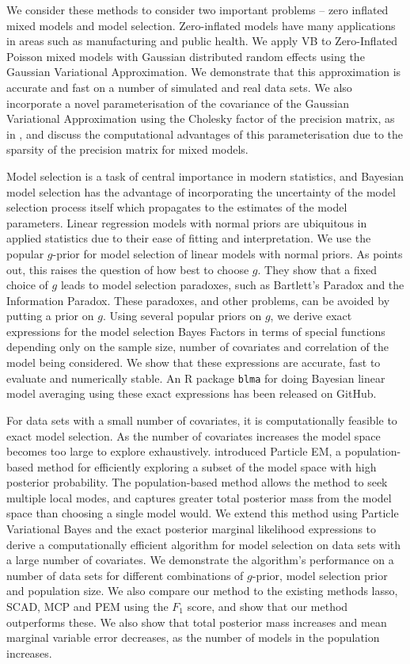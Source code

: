 \documentclass[PhD,stats]{usydthesis}[12pt]
\begin{document}
We consider these methods to consider two important problems -- zero inflated mixed models and model
selection. Zero-inflated models have many applications in areas such as manufacturing and public health. We
apply VB to Zero-Inflated Poisson mixed models with Gaussian distributed random effects using the Gaussian
Variational Approximation. We demonstrate that this approximation is accurate and fast on a number of
simulated and real data sets. We also incorporate a novel parameterisation of the covariance of the Gaussian
Variational Approximation using the Cholesky factor of the precision matrix, as in \cite{Tan2016}, and discuss
the computational advantages of this parameterisation due to the sparsity of the precision matrix for mixed
models.

Model selection is a task of central importance in modern statistics, and  Bayesian model selection has the
advantage of incorporating the uncertainty of the model selection process itself which propagates to the
estimates of the model  parameters. Linear regression models with normal priors are ubiquitous in applied
statistics due to their ease of fitting and interpretation. We use the popular $g$-prior \cite{Zellner1986}
for model selection of linear models with normal priors. As \cite{Liang2008} points out, this raises the
question of how best to choose $g$. They show that a fixed choice of $g$ leads to model selection paradoxes,
such as Bartlett's Paradox and the Information Paradox. These paradoxes, and other problems, can be avoided by
putting a prior on $g$. Using several popular priors on $g$, we derive exact expressions for the model
selection Bayes Factors in terms of special functions depending only on  the sample size, number of covariates
and correlation of the model being considered. We show that these expressions are accurate, fast to evaluate
and numerically stable. An R package \texttt{blma} for doing Bayesian linear model averaging using these
exact expressions has been  released on GitHub.

For data sets with a small number of covariates, it is computationally feasible to exact model selection. As
the number of covariates increases the model space becomes too large to explore exhaustively.
\cite{Rockova2017} introduced Particle EM, a population-based method for efficiently exploring a  subset of
the model space with high posterior probability. The population-based method allows the method to seek
multiple local modes, and captures greater total posterior mass from the model space than choosing a single
model would. We extend this method using Particle Variational Bayes and the exact posterior marginal
likelihood expressions to derive a computationally efficient algorithm for model selection on data sets with a
large number of covariates. We demonstrate the algorithm's performance on a number of data sets for different
combinations of $g$-prior, model selection prior and population size. We also compare our method to the
existing methods lasso, SCAD, MCP and PEM using the $F_1$ score,  and show that our method outperforms these.
We also show that total posterior mass increases and mean marginal variable error decreases, as the number of
models in the population increases.
\end{document}

